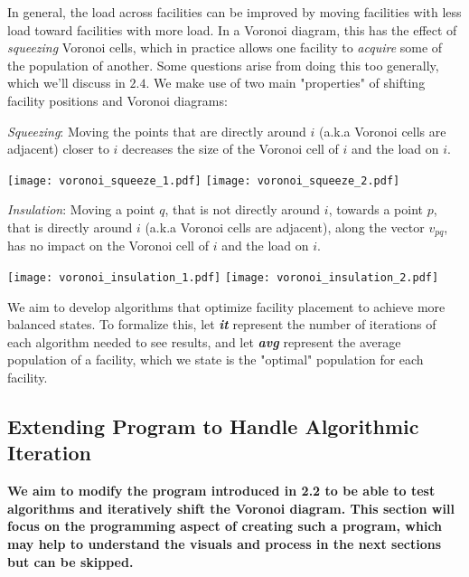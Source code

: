 \documentclass{article}
\begin{document}
In general, the load across facilities can be improved by moving facilities with less load toward facilities with more load. In a Voronoi diagram, this has the effect of \textit{squeezing} Voronoi cells, which in practice allows one facility to \textit{acquire} some of the population of another. Some questions arise from doing this too generally, which we'll discuss in $\mathbf{2.4}$. We make use of two main "properties" of shifting facility positions and Voronoi diagrams:
\vspace{6pt}
\begin{tcolorbox}
\centering
\textit{Squeezing}: Moving the points that are directly around $i$ (a.k.a Voronoi cells are adjacent) closer to $i$ decreases the size of the Voronoi cell of $i$ and the load on $i$.

\texttt{[image: voronoi\_squeeze\_1.pdf]}
\texttt{[image: voronoi\_squeeze\_2.pdf]}
\end{tcolorbox}
\vspace{4pt}
\begin{tcolorbox}
\centering
\textit{Insulation}: Moving a point $q$, that is not directly around $i$, towards a point $p$, that is directly around $i$ (a.k.a Voronoi cells are adjacent), along the vector $v_{pq}$, has no impact on the Voronoi cell of $i$ and the load on $i$.

\texttt{[image: voronoi\_insulation\_1.pdf]}
\texttt{[image: voronoi\_insulation\_2.pdf]}
\end{tcolorbox}
\vspace{6pt}


We aim to develop algorithms that optimize facility placement to achieve more balanced states. To formalize this, let \textit{\textbf{it}} represent the number of iterations of each algorithm needed to see results, and let \textit{\textbf{avg}} represent the average population of a facility, which we state is the "optimal" population for each facility.

\subsection{Extending Program to Handle Algorithmic Iteration}

\textbf{We aim to modify the program introduced in 2.2 to be able to test algorithms and iteratively shift the Voronoi diagram. This section will focus on the programming aspect of creating such a program, which may help to understand the visuals and process in the next sections but can be skipped.} 
\end{document}
